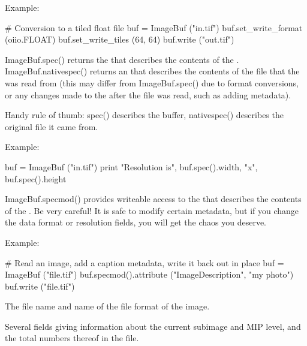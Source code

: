 \noindent Example:
\begin{code}
    # Conversion to a tiled float file
    buf = ImageBuf ("in.tif")
    buf.set_write_format (oiio.FLOAT)
    buf.set_write_tiles (64, 64)
    buf.write ("out.tif")
\end{code}
\apiend

{\cf ImageBuf.spec()} returns the \ImageSpec that describes the contents of
the \ImageBuf.  {\cf ImageBuf.nativespec()} returns an \ImageSpec that
describes the contents of the file that the \ImageBuf was read from (this
may differ from {\cf ImageBuf.spec()} due to format conversions, or any
changes made to the \ImageBuf after the file was read, such as adding
metadata).

Handy rule of thumb: {\cf spec()} describes the buffer, {\cf nativespec()}
describes the original file it came from.

\noindent Example:
\begin{code}
    buf = ImageBuf ("in.tif")
    print "Resolution is", buf.spec().width, "x", buf.spec().height
\end{code}
\apiend

{\cf ImageBuf.specmod()} provides writeable access to the \ImageSpec that
describes the contents of the \ImageBuf.  Be very careful!  It is safe
to modify certain metadata, but if you change the data format or resolution
fields, you will get the chaos you deserve.

\noindent Example:
\begin{code}
    # Read an image, add a caption metadata, write it back out in place
    buf = ImageBuf ("file.tif")
    buf.specmod().attribute ("ImageDescription", "my photo")
    buf.write ("file.tif")
\end{code}
\apiend

The file name and name of the file format of the image.
\apiend

Several fields giving information about the current subimage and MIP
level, and the total numbers thereof in the file.
\apiend

